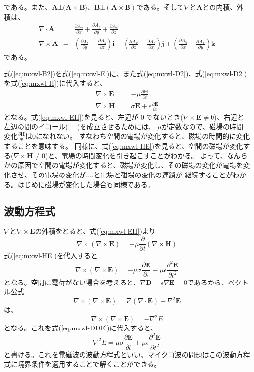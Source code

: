 である。また、$\bm{A}\bot(\bm{A}\times\bm{B}$)、$\bm{B}\bot(\bm{A}\times\bm{B})$である。そして$\nabla$と$\bm{A}$との内積、外積は、
\begin{eqnarray*}
\nabla \cdot \bm{A} &=& \frac{\partial A_x}{\partial x} + \frac{\partial A_y}{\partial y} + \frac{\partial A_z}{\partial z} \\
\nabla \times\bm{A} &=& (\frac{\partial A_z}{\partial y} - \frac{\partial A_y}{\partial z})\bm{i} + (\frac{\partial A_x}{\partial z} - \frac{\partial A_z}{\partial x})\bm{j} + (\frac{\partial A_y}{\partial x} - \frac{\partial A_x}{\partial y})\bm{k}
\end{eqnarray*}
である。

式(\ref{eq:mxwl-B2})を式(\ref{eq:mxwl-E})に、また式(\ref{eq:mxwl-D2})、式(\ref{eq:mxwl-D2})を式(\ref{eq:mxwl-H})に代入すると、
\begin{eqnarray}
\nabla \times \bm{E} &=& -\mu\frac{\partial \bm{H}}{\partial t} \label{eq:mxwl-EH}\\
\nabla \times \bm{H} &=& \sigma\bm{E} + \epsilon\frac{\partial \bm{E}}{\partial t} \label{eq:mxwl-HE}
\end{eqnarray}
となる。式(\ref{eq:mxwl-EH})を見ると、左辺が $0$ でないとき($\nabla\times\bm{E}\neq 0$)、右辺と左辺の間のイコール($=$)を成立させるためには、
$\mu$が定数なので、磁場の時間変化$\frac{\partial \bm{H}}{\partial t}$は$0$になれない。
すなわち空間の電場が変化すると、磁場の時間的に変化することを意味する。
同様に、式(\ref{eq:mxwl-HE})を見ると、空間の磁場が変化する($\nabla\times\bm{H}\neq 0$)と、電場の時間変化を引き起こすことがわかる。
よって、なんらかの原因で空間の電場が変化すると、磁場が変化し、その磁場の変化が電場を変化させ、その電場の変化が....と電場と磁場の変化の連鎖が
継続することがわかる。はじめに磁場が変化した場合も同様である。

\subsection{波動方程式}
$\nabla$と$\nabla\times\bm{E}$の外積をとると、式(\ref{eq:mxwl-EH})より
\[
\nabla\times(\nabla\times\bm{E}) = -\mu \frac{\partial}{\partial t}(\nabla\times\bm{H})
\]
式(\ref{eq:mxwl-HE})を代入すると
\begin{equation}
\nabla\times(\nabla\times\bm{E}) = -\mu \sigma\frac{\partial\bm{E}}{\partial t} - \mu\epsilon\frac{\partial^2 \bm{E}}{\partial t^2} \label{eq:mxwl-DDE}
\end{equation}
となる。空間に電荷がない場合を考えると、$\nabla\bm{D}=\epsilon\nabla\bm{E} = 0$であるから、ベクトル公式
\[\nabla\times(\nabla\times\bm{E}) = \nabla(\nabla\cdot\bm{E})-\nabla^2\bm{E}
\]
は、
\[
\nabla\times(\nabla\times\bm{E}) = -\nabla^2 E
\]
となる。これを式(\ref{eq:mxwl-DDE})に代入すると、
\begin{equation}
\nabla^2 E = \mu \sigma\frac{\partial\bm{E}}{\partial t} + \mu\epsilon\frac{\partial^2 \bm{E}}{\partial t^2} \label{eq:mxwl-wveq}
\end{equation}
と書ける。これを電磁波の波動方程式といい、マイクロ波の問題はこの波動方程式に境界条件を適用することで解くことができる。


